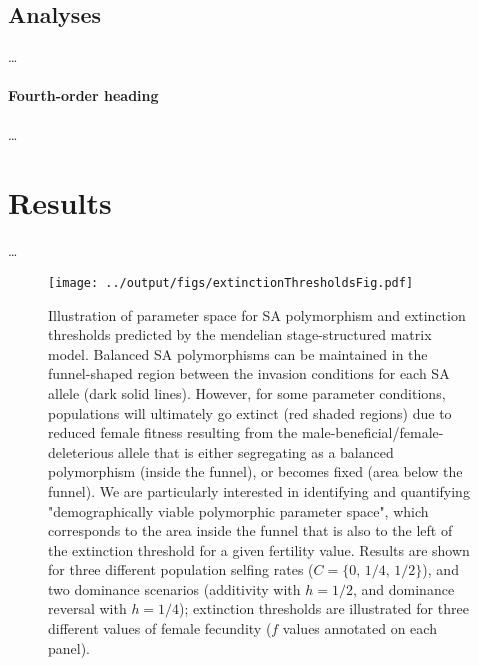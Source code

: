 \documentclass[11pt]{article}
\begin{document}
\subsection*{Analyses} \label{sec:analyses}

\ldots


\paragraph*{Fourth-order heading}
\ldots


\section*{Results}
\ldots



 \begin{figure}[htbp]
 \centering
 \texttt{[image: ../output/figs/extinctionThresholdsFig.pdf]}
 \caption{Illustration of parameter space for SA polymorphism and extinction thresholds predicted by the mendelian stage-structured matrix model. Balanced SA polymorphisms can be maintained in the funnel-shaped region between the invasion conditions for each SA allele (dark solid lines). However, for some parameter conditions, populations will ultimately go extinct (red shaded regions) due to reduced female fitness resulting from the male-beneficial/female-deleterious allele that is either segregating as a balanced polymorphism (inside the funnel), or becomes fixed (area below the funnel). We are particularly interested in identifying and quantifying "demographically viable polymorphic parameter space", which corresponds to the area inside the funnel that is also to the left of the extinction threshold for a given fertility value. Results are shown for three different population selfing rates ($C = \{0,\,1/4,\,1/2\}$), and two dominance scenarios (additivity with $h = 1/2$, and dominance reversal with $h = 1/4$); extinction thresholds are illustrated for three different values of female fecundity ($f$ values annotated on each panel). }
 \label{fig:extThresholds}
 \end{figure}
\end{document}
